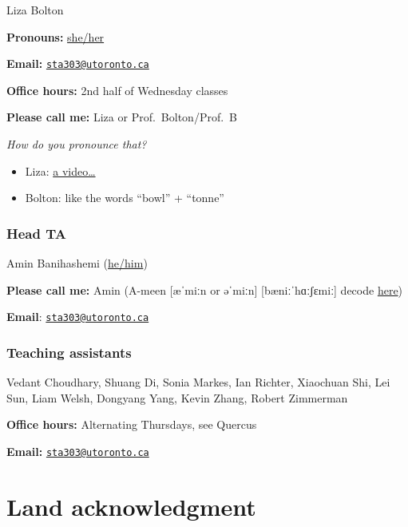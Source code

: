 \documentclass[
  openany]{book}
\begin{document}
Liza Bolton

\textbf{Pronouns:} \href{https://www.mypronouns.org/she-her}{she/her}

\textbf{Email:} \href{mailto:sta303@utoronto.ca}{\nolinkurl{sta303@utoronto.ca}}

\textbf{Office hours:} 2nd half of Wednesday classes

\textbf{Please call me:} Liza or Prof.~Bolton/Prof.~B

\emph{How do you pronounce that?}

\begin{itemize}
\item
  Liza: \href{https://www.youtube.com/watch?v=hWURas7fYwk}{a video\ldots{}}
\item
  Bolton: like the words ``bowl'' + ``tonne''
\end{itemize}

\hypertarget{head-ta}{%
\subsubsection{Head TA}\label{head-ta}}

Amin Banihashemi (\href{https://www.mypronouns.org/he-him}{he/him})

\textbf{Please call me:} Amin (A-meen {[}æˈmiːn or əˈmiːn{]} {[}bæniːˈhɑːʃɛmiː{]} decode \href{https://easypronunciation.com/en/phonetic-symbols-chart/british-english/ipa}{here})

\textbf{Email}: \href{mailto:sta303@utoronto.ca}{\nolinkurl{sta303@utoronto.ca}}

\hypertarget{teaching-assistants}{%
\subsubsection{Teaching assistants}\label{teaching-assistants}}

Vedant Choudhary, Shuang Di, Sonia Markes, Ian Richter, Xiaochuan Shi, Lei Sun, Liam Welsh, Dongyang Yang, Kevin Zhang, Robert Zimmerman

\textbf{Office hours:} Alternating Thursdays, see Quercus

\textbf{Email:} \href{mailto:sta303@utoronto.ca}{\nolinkurl{sta303@utoronto.ca}}

\hypertarget{land-acknowledgment}{%
\section{Land acknowledgment}\label{land-acknowledgment}}
\end{document}
